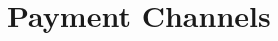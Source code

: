 \documentclass{article}
\begin{document}






\section{Payment Channels}\label{ref:channels}
\end{document}
